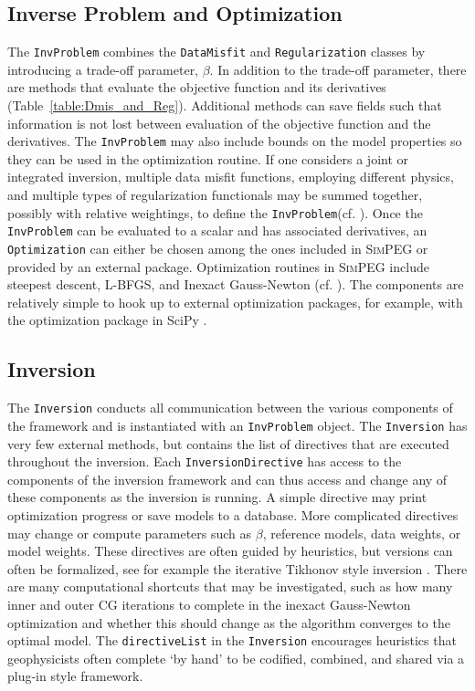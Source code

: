 \documentclass[preprint,review,3p,times,onecolumn,authoryear]{elsarticle}
\newcommand{\SimPEG}{\textsc{SimPEG}\xspace}
\newcommand{\Regularization}{\texttt{Regularization}\xspace}
\newcommand{\DataMisfit}{\texttt{DataMisfit}\xspace}
\newcommand{\Optimization}{\texttt{Optimization}\xspace}
\newcommand{\InvProblem}{\texttt{InvProblem}\xspace}
\newcommand{\Inversion}{\texttt{Inversion}\xspace}
\begin{document}
\subsection*{Inverse Problem and Optimization}

The \InvProblem combines the \DataMisfit and \Regularization classes by introducing a
trade-off parameter, $\beta$. In addition to the trade-off parameter, there are
methods that evaluate the objective function and its derivatives (Table~\ref{table:Dmis_and_Reg}). Additional methods can save fields
such that information is not lost between evaluation of the objective function and the derivatives.
The \InvProblem may also include bounds on the model properties so they can be used in the optimization routine.
If one considers a joint or integrated inversion, multiple data misfit functions, employing different physics, and multiple types of regularization functionals may be summed together, possibly with relative weightings, to define the \InvProblem (cf. \cite{lines1988cooperative,Holtham2010,HeagySEG2014}).
Once the \InvProblem can be evaluated to a scalar and has associated derivatives, an \Optimization can either be chosen among the ones included in \SimPEG or provided by an external package.
Optimization routines in \SimPEG include steepest descent, L-BFGS, and Inexact Gauss-Newton (cf. \cite{Nocedal1999}).
The components are relatively simple to hook up to external optimization packages, for example, with the optimization package in SciPy \citep{scipy}.

\subsection{Inversion}

The \Inversion conducts all communication between the various components of the framework
and is instantiated with an \InvProblem object.
The \Inversion has very few external methods, but contains the list of directives that are executed throughout the inversion.
Each \texttt{InversionDirective} has access to the components of the inversion framework and can thus access and change any of these components as the inversion is running.
A simple directive may print optimization progress or save models to a database.
More complicated directives may change or compute parameters such as $\beta$, reference models, data weights, or model weights. These directives are often guided by heuristics, but versions can often be formalized, see for example the iterative Tikhonov style inversion \citep{tikhonov1977solutions,parker1994geophysical,DougTutorial}.
There are many computational shortcuts that may be investigated, such as how many inner and outer CG iterations to complete in the inexact Gauss-Newton optimization and whether this should change as the algorithm converges to the optimal model.
The \texttt{directiveList} in the \Inversion encourages heuristics that geophysicists often complete `by hand' to be codified, combined, and shared via a plug-in style framework.
\end{document}
